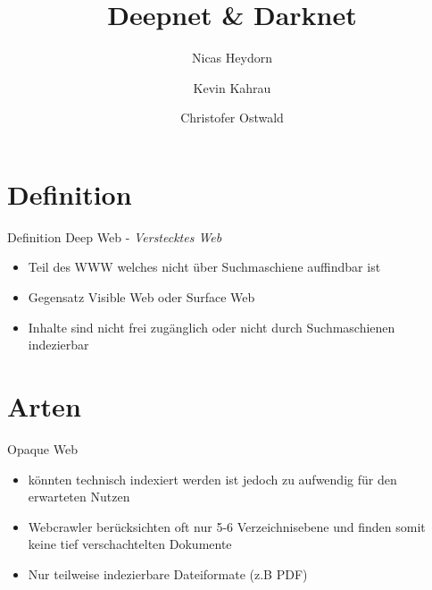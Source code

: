 \documentclass[12pt]{beamer}
\author{Nicas Heydorn \and Kevin Kahrau \and Christofer Ostwald}
\title{Deepnet \& Darknet}
\institute{Nordakademie - Hochschule der Wirtschaft}
\begin{document}
\begin{frame}
\titlepage
\end{frame}

\begin{frame}
\tableofcontents
\end{frame}


\section{Definition}

\begin{frame}{Definition}
	Deep Web - \emph{Verstecktes Web}
	\begin{itemize}
		\item Teil des WWW welches nicht über Suchmaschiene auffindbar ist
		\item Gegensatz Visible Web oder Surface Web
\item Inhalte sind nicht frei zugänglich oder nicht durch Suchmaschienen indezierbar
	\end{itemize}
\end{frame}



\section{Arten}

\begin{frame}{Opaque Web}
	\begin{itemize}
		\item könnten technisch indexiert werden ist jedoch zu aufwendig für den erwarteten Nutzen
		\item Webcrawler berücksichten oft nur 5-6 Verzeichnisebene und finden somit keine tief verschachtelten Dokumente
		\item Nur teilweise indezierbare Dateiformate (z.B PDF)
	\end{itemize}
\end{frame}
\end{document}
